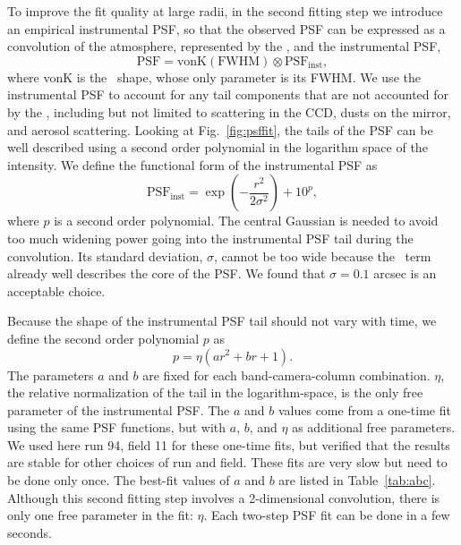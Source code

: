 To improve the fit quality at large radii, in the second fitting step we introduce an
empirical instrumental PSF, so that the observed PSF can be expressed as
a convolution of the atmosphere, represented by the \vk, and
the instrumental PSF,
\begin{equation}
        \textrm{PSF} = \textrm{vonK} (\textrm{FWHM}) \otimes \textrm{PSF}_{\textrm{inst}},
\end{equation} 
where vonK is the \vk~shape, whose only parameter is its FWHM.
We use the instrumental PSF to account for any tail components that
are not accounted for by the \vk, including but not limited to
scattering in the CCD, dusts on the mirror, and aerosol scattering.
Looking at Fig.~\ref{fig:psffit}, the tails of the PSF can be well
described using a second order polynomial in the logarithm space of
the intensity.
We define the functional form of the instrumental PSF as
\begin{equation}
        \textrm{PSF}_{\textrm{inst}} = \exp(-\frac{r^2}{2\sigma^2}) + 10^p,
\label{eq:psfinst}
\end{equation} 
where $p$ is a second order polynomial.
The central Gaussian is needed to avoid too much widening power going
into the instrumental PSF tail during the convolution.
Its standard deviation, $\sigma$, cannot be
too wide because the \vk~term already well describes the core of the
PSF.
We found that $\sigma = 0.1$ arcsec is an acceptable choice.

Because the shape of the instrumental PSF tail should not vary with
time, we define the second order polynomial $p$ as
\begin{equation}
        p = \eta(ar^2+br+1).
\label{eq:psfinstp}
\end{equation} 
The parameters $a$ and $b$ are
fixed for each band-camera-column combination.
$\eta$, the relative normalization of the 
tail in the logarithm-space, is the only free
parameter of the instrumental PSF.
The $a$ and $b$ values come from a one-time fit using the same PSF functions,
but with $a$, $b$, and $\eta$ as additional free parameters.
We used here run 94, field 11 for these one-time fits, but verified that 
the results are stable for other choices of run and field. 
These fits are very slow but need to be done only once.
The best-fit values of $a$ and $b$ are listed in Table~\ref{tab:abc}.
Although this second fitting step involves a 2-dimensional convolution,
there is only one free parameter in the fit: $\eta$. 
Each two-step PSF fit can be done in a few seconds.

